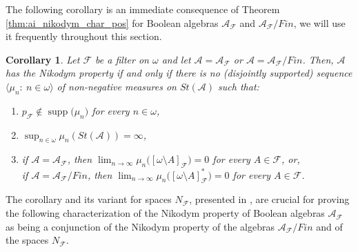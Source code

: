 \documentclass[a4paper,11pt,fleqn]{amsart}
\newtheorem{proposition}[theorem]{Proposition}
\newtheorem{corollary}[theorem]{Corollary}
\theoremstyle{definition}
\theoremstyle{remark}
\numberwithin{equation}{section}
\newcommand{\N}{\mathbb{N}}
\newcommand{\aA}{\mathcal{A}}
\newcommand{\fF}{\mathcal{F}}
\newcommand{\rstr}{\restriction}
\newcommand{\sm}{\setminus}
\DeclareMathOperator{\supp}{supp}
\newcommand{\seqn}[1]{\big\langle#1\colon\ n\io\big\rangle}
\newcommand{\clopen}[1]{\left[#1\right]}
\newcommand{\io}{\in\omega}%
\begin{document}

The following corollary is an immediate consequence of Theorem \ref{thm:ai_nikodym_char_pos} for Boolean algebras $\aA_\fF$ and $\aA_\fF/Fin$, we will use it frequently throughout this section.

\begin{corollary}\label{cor:sf_an_char_pos}
Let $\fF$ be a filter on $\omega$ and let $\aA=\aA_{\fF}$ or $\aA=\aA_{\fF}/Fin$. Then, $\aA$ has the Nikodym property if and only if there is no (disjointly supported) sequence $\seqn{\mu_n}$ of non-negative measures on $St(\aA)$ such that:
\begin{enumerate}
\item $p_{\fF}\not\in\supp\big(\mu_n\big)$ for every $n\io$,
\item $\sup_{n\in\omega}\mu_n(St(\aA))=\infty$,
\item if $\aA=\aA_{\fF}$, then $\lim_{n\to\infty}\mu_n\big(\clopen{\omega\sm A}_{\fF}\big)=0$ for every $A\in\fF$, or,\\ if $\aA=\aA_{\fF}/Fin$, then $\lim_{n\to\infty}\mu_n\big(\clopen{\omega\sm A}_{\fF}^*\big)=0$ for every $A\in\fF$.
\end{enumerate}
\end{corollary}

The corollary and its variant for spaces $N_\fF$, presented in \cite[Theorem 4.1]{Zuc25}, are crucial for proving the following characterization of the Nikodym property of Boolean algebras $\aA_\fF$ as being a conjunction of the Nikodym property of the algebras $\aA_\fF/Fin$ and of the spaces $N_\fF$.
\end{document}
